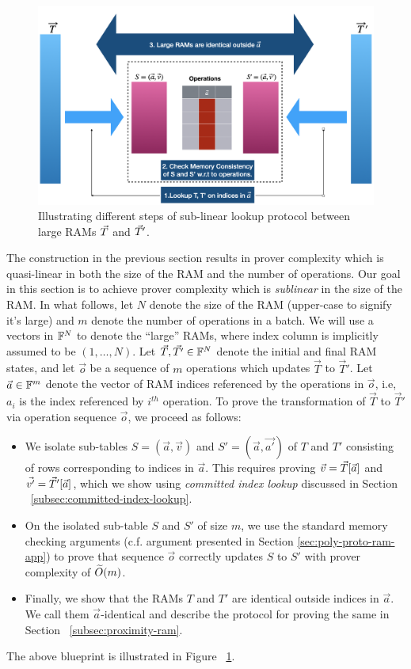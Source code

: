 \begin{figure}[htbp]
    \centering
    \includegraphics[width=\textwidth]{RAM-Lookup}
    \caption{Illustrating different steps of sub-linear lookup protocol between large RAMs $\vec{T}$ and $\vec{T}'$.}
    \label{fig:blueprint}
\end{figure}

The construction in the previous section results in prover complexity which is quasi-linear in both the
size of the RAM and the number of operations.
Our goal in this section is to achieve prover complexity which is {\em sublinear} in the size of the RAM.
In what follows, let $N$ denote the size of the RAM (upper-case to signify it's large) and $m$ denote the number
of operations in a batch. We will use a vectors in $\mathbb{F}^N$ to denote the ``large'' RAMs, where index column is implicitly
assumed to be $(1,\ldots,N)$.
Let $\vec{T},\vec{T'}\in \mathbb{F}^N$ denote the initial and final RAM states, and let $\vec{o}$ be
a sequence of $m$ operations which updates $\vec{T}$ to $\vec{T}'$. Let $\vec{a}\in \mathbb{F}^m$ denote the vector
of RAM indices referenced by the operations in $\vec{o}$, i.e, $a_i$ is the index referenced by $i^{th}$ operation.
To prove the transformation of $\vec{T}$ to $\vec{T}'$ via operation sequence $\vec{o}$, we proceed as follows:
\begin{itemize}[leftmargin=2em, label=-]
\item We isolate sub-tables $S=(\vec{a},\vec{v})$ and $S'=(\vec{a},\vec{a'})$ of $T$ and $T'$ consisting of
rows corresponding to indices in $\vec{a}$. This requires proving $\vec{v}=\vec{T}[\vec{a}]$ and $\vec{v'}=
\vec{T}'[\vec{a}]$, which we show using {\em committed index lookup} discussed in Section ~\ref{subsec:committed-index-lookup}.

\item On the isolated sub-table $S$ and $S'$ of size $m$, we use the standard memory checking arguments (c.f. argument
presented in Section \ref{sec:poly-proto-ram-app}) to prove that sequence $\vec{o}$ correctly updates $S$ to $S'$ with
prover complexity of $\widetilde{O}(m)$.

\item Finally, we show that the RAMs $T$ and $T'$ are identical outside indices in $\vec{a}$. We call them $\vec{a}$-identical
and describe the protocol for proving the same in Section ~\ref{subsec:proximity-ram}.
\end{itemize}
The above blueprint is illustrated in Figure ~\ref{fig:blueprint}.

